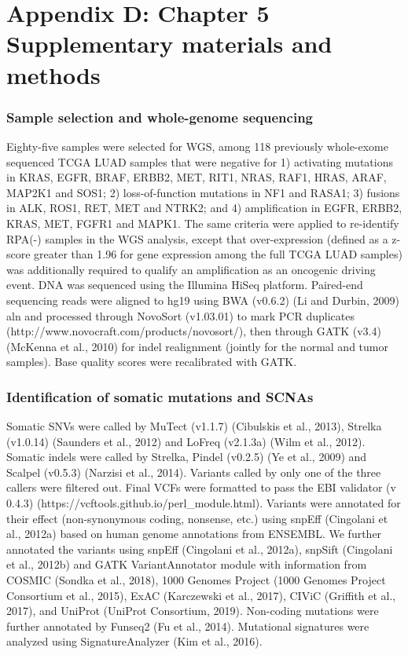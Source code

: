 \documentclass[phd,tocprelim]{cornell}
\begin{document}
\subsection*{}

\chapter{Appendix D: Chapter 5 Supplementary materials and methods}
\subsection*{Sample selection and whole-genome sequencing}
Eighty-five samples were selected for WGS, among 118 previously whole-exome sequenced TCGA LUAD samples that were negative for 1) activating mutations in KRAS, EGFR, BRAF, ERBB2, MET, RIT1, NRAS, RAF1, HRAS, ARAF, MAP2K1 and SOS1; 2) loss-of-function mutations in NF1 and RASA1; 3) fusions in ALK, ROS1, RET, MET and NTRK2; and 4) amplification in EGFR, ERBB2, KRAS, MET, FGFR1 and MAPK1. The same criteria were applied to re-identify RPA(-) samples in the WGS analysis, except that over-expression (defined as a z-score greater than 1.96 for gene expression among the full TCGA LUAD samples) was additionally required to qualify an amplification as an oncogenic driving event. 
DNA was sequenced using the Illumina HiSeq platform. Paired-end sequencing reads were aligned to hg19 using BWA (v0.6.2) (Li and Durbin, 2009) aln and processed through NovoSort (v1.03.01) to mark PCR duplicates (http://www.novocraft.com/products/novosort/), then through GATK (v3.4) (McKenna et al., 2010) for indel realignment (jointly for the normal and tumor samples). Base quality scores were recalibrated with GATK.

\subsection*{Identification of somatic mutations and SCNAs}
Somatic SNVs were called by MuTect (v1.1.7) (Cibulskis et al., 2013), Strelka (v1.0.14) (Saunders et al., 2012) and LoFreq (v2.1.3a) (Wilm et al., 2012). Somatic indels were called by Strelka, Pindel (v0.2.5) (Ye et al., 2009) and Scalpel (v0.5.3) (Narzisi et al., 2014). Variants called by only one of the three callers were filtered out. Final VCFs were formatted to pass the EBI validator (v 0.4.3) (https://vcftools.github.io/perl\_module.html). Variants were annotated for their effect (non-synonymous coding, nonsense, etc.) using snpEff (Cingolani et al., 2012a) based on human genome annotations from ENSEMBL. We further annotated the variants using snpEff (Cingolani et al., 2012a), snpSift (Cingolani et al., 2012b) and GATK VariantAnnotator module with information from COSMIC (Sondka et al., 2018), 1000 Genomes Project (1000 Genomes Project Consortium et al., 2015), ExAC (Karczewski et al., 2017), CIViC (Griffith et al., 2017), and UniProt (UniProt Consortium, 2019). Non-coding mutations were further annotated by Funseq2 (Fu et al., 2014). Mutational signatures were analyzed using SignatureAnalyzer (Kim et al., 2016).
\end{document}
